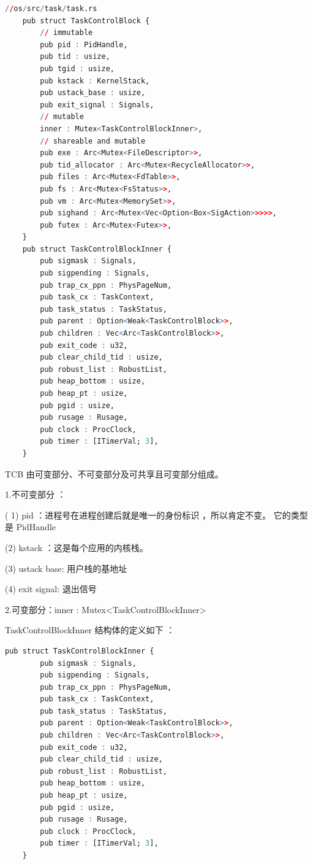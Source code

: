 \begin{lstlisting}[language=R]
	//os/src/task/task.rs
	pub struct TaskControlBlock {
		// immutable
		pub pid : PidHandle,
		pub tid : usize,
		pub tgid : usize,
		pub kstack : KernelStack,
		pub ustack_base : usize,
		pub exit_signal : Signals,
		// mutable
		inner : Mutex<TaskControlBlockInner>,
		// shareable and mutable
		pub exe : Arc<Mutex<FileDescriptor>>,
		pub tid_allocator : Arc<Mutex<RecycleAllocator>>,
		pub files : Arc<Mutex<FdTable>>,
		pub fs : Arc<Mutex<FsStatus>>,
		pub vm : Arc<Mutex<MemorySet>>,
		pub sighand : Arc<Mutex<Vec<Option<Box<SigAction>>>>>,
		pub futex : Arc<Mutex<Futex>>,
	}
	pub struct TaskControlBlockInner {
		pub sigmask : Signals,
		pub sigpending : Signals,
		pub trap_cx_ppn : PhysPageNum,
		pub task_cx : TaskContext,
		pub task_status : TaskStatus,
		pub parent : Option<Weak<TaskControlBlock>>,
		pub children : Vec<Arc<TaskControlBlock>>,
		pub exit_code : u32,
		pub clear_child_tid : usize,
		pub robust_list : RobustList,
		pub heap_bottom : usize,
		pub heap_pt : usize,
		pub pgid : usize,
		pub rusage : Rusage,
		pub clock : ProcClock,
		pub timer : [ITimerVal; 3],
	}
\end{lstlisting}

TCB 由可变部分、不可变部分及可共享且可变部分组成。

1.不可变部分 ：

( 1)   pid ：进程号在进程创建后就是唯一的身份标识 ，所以肯定不变。  它的类型是 PidHandle 	

(2)   kstack ：这是每个应用的内核栈。

(3)  ustack base: 用户栈的基地址 

(4)  exit signal: 退出信号

2.可变部分：inner : Mutex<TaskControlBlockInner>

TaskControlBlockInner 结构体的定义如下 ：

\begin{lstlisting}[language=R]
	pub struct TaskControlBlockInner {
		pub sigmask : Signals,
		pub sigpending : Signals,
		pub trap_cx_ppn : PhysPageNum,
		pub task_cx : TaskContext,
		pub task_status : TaskStatus,
		pub parent : Option<Weak<TaskControlBlock>>,
		pub children : Vec<Arc<TaskControlBlock>>,
		pub exit_code : u32,
		pub clear_child_tid : usize,
		pub robust_list : RobustList,
		pub heap_bottom : usize,
		pub heap_pt : usize,
		pub pgid : usize,
		pub rusage : Rusage,
		pub clock : ProcClock,
		pub timer : [ITimerVal; 3],
	}
\end{lstlisting}	

